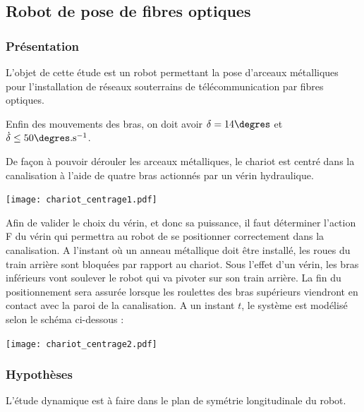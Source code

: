 \ifprof
\else
\begin{multicols}{2}
\fi

\subsection*{Robot de pose de fibres optiques}
\subsubsection*{Présentation}

L'objet de cette étude est un robot permettant la pose d'arceaux métalliques pour l'installation de réseaux souterrains de télécommunication par fibres optiques.

\begin{obj}
Enfin des mouvements des bras, on doit avoir $\delta=14\degres$ et $\dot{\delta}\leq 50\degres.\text{s}^{-1}$.
\end{obj}
%

De façon à pouvoir dérouler les arceaux métalliques, le chariot est centré dans la canalisation à l'aide de quatre bras actionnés par un vérin hydraulique.

\begin{center}
\texttt{[image: chariot\_centrage1.pdf]}
\end{center}


Afin de valider le choix du vérin, et donc sa puissance, il faut déterminer l'action F du vérin
qui permettra au robot de se positionner correctement dans la canalisation.
A l'instant où un anneau métallique doit
être installé, les roues du train arrière sont
bloquées par rapport au chariot. Sous l'effet
d'un vérin, les bras inférieurs vont soulever le
robot qui va pivoter sur son train arrière. La fin
du positionnement sera assurée lorsque les
roulettes des bras supérieurs viendront en
contact avec la paroi de la canalisation.
A un instant $t$, le système est modélisé selon le schéma ci-dessous :


\begin{center}
\texttt{[image: chariot\_centrage2.pdf]}
\end{center}


\subsubsection*{Hypothèses}
L'étude dynamique est à faire dans le plan de symétrie longitudinale du robot.


\end{multicols}
